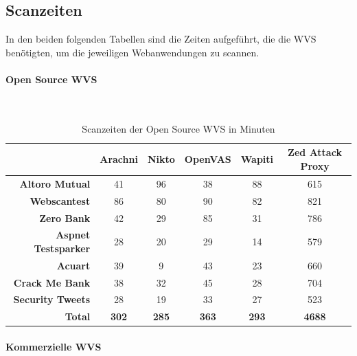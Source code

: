 \documentclass[12pt,oneside,a4paper,parskip,pointlessnumbers]{scrbook}
\begin{document}
     \subsection{Scanzeiten}
     In den beiden folgenden Tabellen sind die Zeiten aufgeführt, die die WVS benötigten, um die jeweiligen Webanwendungen zu scannen.
     \paragraph{Open Source WVS}
     \
\begin{table}[H]
\begin{tabular}{|r|c|c|c|c|c|}
\hline
                            & \textbf{Arachni} & \textbf{Nikto} & \textbf{OpenVAS} & \textbf{Wapiti} & \textbf{Zed Attack Proxy}  \\
\hline
\textbf{Altoro Mutual}      & 41               & 96             & 38               & 88              & 615                        \\
\hline
\textbf{Webscantest}        & 86               & 80             & 90               & 82              & 821                        \\
\hline
\textbf{Zero Bank}          & 42               & 29             & 85               & 31              & 786                        \\
\hline
\textbf{Aspnet Testsparker} & 28               & 20             & 29               & 14              & 579                        \\
\hline
\textbf{Acuart}             & 39               & 9              & 43               & 23              & 660                        \\
\hline
\textbf{Crack Me Bank}      & 38               & 32             & 45               & 28              & 704                        \\
\hline
\textbf{Security Tweets}    & 28               & 19             & 33               & 27              & 523                        \\
\hline
\textbf{Total}              & \textbf{302}     & \textbf{285}   & \textbf{363}     & \textbf{293}    & \textbf{4688}              \\
\hline
\end{tabular}
\caption[Scanzeiten der Open Source WVS in Minuten]{Scanzeiten der Open Source WVS in Minuten}
\end{table}
\paragraph{Kommerzielle WVS}
\
\end{document}
